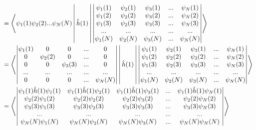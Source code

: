 \documentclass[a4paper]{article}
\begin{document}
 \begin{equation}
 \begin{aligned}
 &= \Braket{  \psi_1(1)\psi_2(2)...\psi_N(N)  | \hat{h}(1) |
\begin{vmatrix} \psi_1(1) & \psi_2(1)& \psi_3(1) & ... & \psi_N(1) \\
    \psi_1(2) & \psi_2(2) & \psi_3(2) &...& \psi_N(2) \\
    \psi_1(3) & \psi_2(3) & \psi_3(3) &...& \psi_N(3) \\
    ... & ... & ... & ...& ... \\
    \psi_1(N) & \psi_2(N) & \psi_3(N) &...& \psi_N(N)\\
    \end{vmatrix} } \\
    &=
    \Braket{ 
     \begin{vmatrix} \psi_1(1) &0 & 0&... & 0 \\
    0 & \psi_2(2) & 0& ...& 0\\
    0 & 0 & \psi_3(3)& ...& 0\\
    ... & ... & ... & ... &...\\
    0 & 0 & 0&...& \psi_N(N)\\
    \end{vmatrix}  
    |\hat{h}(1) |
    \begin{vmatrix} \psi_1(1) & \psi_2(1)& \psi_3(1) & ... & \psi_N(1) \\
    \psi_1(2) & \psi_2(2) & \psi_3(2) &...& \psi_N(2) \\
    \psi_1(3) & \psi_2(3) & \psi_3(3) &...& \psi_N(3) \\
    ... & ... & ... & ...& ... \\
    \psi_1(N) & \psi_2(N) & \psi_3(N) &...& \psi_N(N)\\
    \end{vmatrix} } \\
    &=
      \Braket{ 
     \begin{vmatrix} 
    \psi_1(1)\hat{h}(1) \psi_1(1) & \psi_1(1)\hat{h}(1)\psi_2(1)& \psi_1(1)\hat{h}(1)\psi_3(1) & ... & \psi_1(1) \hat{h}(1)\psi_N(1) \\
    \psi_2(2) \psi_1(2) & \psi_2(2)\psi_2(2) & \psi_2(2) \psi_3(2) &...& \psi_2(2)\psi_N(2) \\
    \psi_3(3) \psi_1(3) & \psi_3(3)\psi_2(3) & \psi_3(3) \psi_3(3) &...& \psi_3(3)\psi_N(3) \\
    ... & ... & ... & ...& ... \\
    \psi_N(N) \psi_1(N) &\psi_N(N) \psi_2(N) & \psi_N(N) \psi_3(N) &...& \psi_N(N)\psi_N(N)\\

\end{vmatrix}}
\end{aligned}
\end{equation}
\end{document}
